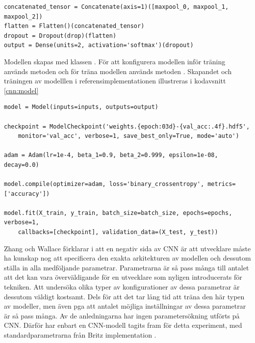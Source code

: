 \documentclass{kaumasters} %
\begin{document}
\begin{lstlisting}[style=mypython,caption={Kod för att sätta samman en ny särdragsvektor och koppla in ett fullt anslutet lager.},label=cnn:output]
concatenated_tensor = Concatenate(axis=1)([maxpool_0, maxpool_1, maxpool_2])
flatten = Flatten()(concatenated_tensor)
dropout = Dropout(drop)(flatten)
output = Dense(units=2, activation='softmax')(dropout)
\end{lstlisting}

Modellen skapas med klassen  \cite{impcnn:008}. För att konfigurera modellen inför träning används metoden  \cite{impcnn:008} och för träna modellen används metoden  \cite{impcnn:008}. Skapandet och träningen av modelllen i referensimplementationen illustreras i kodavsnitt \ref{cnn:model}

\begin{lstlisting}[style=mypython,caption={Kod för att skapa och träna CNN-klassificeraren.},label=cnn:model]
model = Model(inputs=inputs, outputs=output)

checkpoint = ModelCheckpoint('weights.{epoch:03d}-{val_acc:.4f}.hdf5', 
    monitor='val_acc', verbose=1, save_best_only=True, mode='auto')

adam = Adam(lr=1e-4, beta_1=0.9, beta_2=0.999, epsilon=1e-08, decay=0.0)

model.compile(optimizer=adam, loss='binary_crossentropy', metrics=['accuracy'])

model.fit(X_train, y_train, batch_size=batch_size, epochs=epochs, verbose=1, 
    callbacks=[checkpoint], validation_data=(X_test, y_test))
\end{lstlisting}

Zhang och Wallace förklarar i \cite{cnn:002} att en negativ sida av CNN är att utvecklare måste ha kunskap nog att specificera den exakta arkitekturen av modellen och dessutom ställa in alla medföljande parametrar.  Parametrarna är så pass många till antalet att det kan vara överväldigande för en utvecklare som nyligen introducerats för tekniken. Att undersöka olika typer av konfigurationer av dessa parametrar är dessutom väldigt kostsamt. Dels för att det tar lång tid att träna den här typen av modeller, men även pga att antalet möjliga inställningar av dessa parametrar är så pass många. Av de anledningarna har ingen parametersökning utförts på CNN. Därför har enbart en CNN-modell tagits fram för detta experiment, med standardparametrarna från Britz implementation \cite{impcnn:002}.
\end{document}
